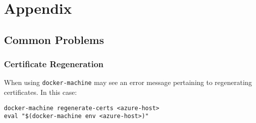 \documentclass[11pt]{article}
\begin{document}
\section{Appendix}
\label{sec:orgheadline46}
\subsection{Common Problems}
\label{sec:orgheadline45}
\subsubsection{Certificate Regeneration}
\label{sec:orgheadline44}

When using \texttt{docker-machine}  may see an error message pertaining to regenerating certificates. In this case:

\begin{verbatim}
docker-machine regenerate-certs <azure-host>
eval "$(docker-machine env <azure-host>)"
\end{verbatim}
\end{document}
